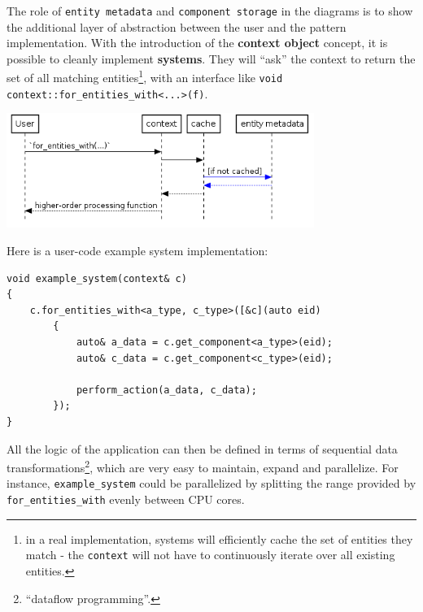 \documentclass[oneside, 12pt, a4paper, openany]{book}
\let\origfigure=\figure
\let\endorigfigure=\endfigure
\renewenvironment{figure}[1][]{%
\origfigure[H]
}{%
\endorigfigure
}
\begin{document}
The role of
\texttt{entity metadata}
and
\texttt{component storage}
in the diagrams is to show the additional layer of abstraction between
the user and the pattern implementation. With the introduction of the
\textbf{context object} concept, it is possible to cleanly implement
\textbf{systems}. They will ``ask'' the context to return the set of all
matching entities\footnote{in a real implementation, systems will
  efficiently cache the set of entities they match - the
  \texttt{context}
  will not have to continuously iterate over all existing entities.},
with an interface like
\texttt{void context::for_entities_with<...>(f)}.

\begin{figure}[htbp]
\centering
\includegraphics[width=0.75000\textwidth]{source/figures/generated/ecs/overview/dod_composition/uml_context_for_entities_with.png}
\caption{DOD: retrieving entities matching a component type set through
context object}
\end{figure}

Here is a user-code example system implementation:

\begin{verbatim}
void example_system(context& c)
{
    c.for_entities_with<a_type, c_type>([&c](auto eid)
        {
            auto& a_data = c.get_component<a_type>(eid);
            auto& c_data = c.get_component<c_type>(eid);

            perform_action(a_data, c_data);
        });
}
\end{verbatim}

All the logic of the application can then be defined in terms of
sequential data transformations\footnote{``dataflow programming''.},
which are very easy to maintain, expand and parallelize. For instance,
\texttt{example_system}
could be parallelized by splitting the range provided by
\texttt{for_entities_with}
evenly between CPU cores.
\end{document}
